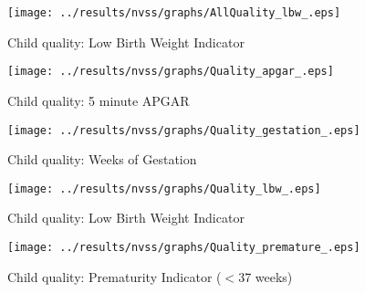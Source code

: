 \begin{figure}[htpb!]
\centering
\caption{Child quality: Low Birth Weight Indicator}
\label{QApgar}
\texttt{[image: ../results/nvss/graphs/AllQuality\_lbw\_.eps]}
\end{figure}
\vspace{1cm}


\begin{figure}[htpb!]
\centering
\caption{Child quality: 5 minute APGAR}
\label{QApgar}
\texttt{[image: ../results/nvss/graphs/Quality\_apgar\_.eps]}
\end{figure}
\vspace{5mm}

\begin{figure}[htpb!]
\centering
\caption{Child quality: Weeks of Gestation}
\label{QApgar}
\texttt{[image: ../results/nvss/graphs/Quality\_gestation\_.eps]}
\end{figure}
\vspace{5mm}


\begin{figure}[htpb!]
\centering
\caption{Child quality: Low Birth Weight Indicator}
\label{QApgar}
\texttt{[image: ../results/nvss/graphs/Quality\_lbw\_.eps]}
\end{figure}
\vspace{1cm}

\begin{figure}[htpb!]
\centering
\caption{Child quality: Prematurity Indicator ($<$37 weeks)}
\label{QApgar}
\texttt{[image: ../results/nvss/graphs/Quality\_premature\_.eps]}
\end{figure}
